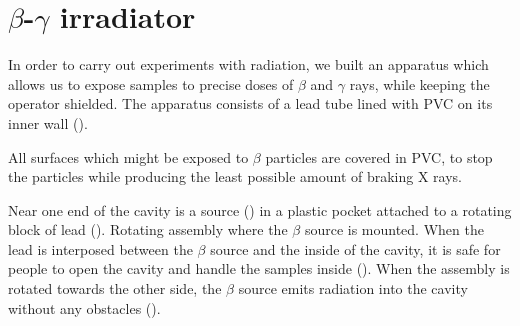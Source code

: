 \section{$\beta$-$\gamma$ irradiator}
\label{sec:irradiador}
In order to carry out experiments with radiation,
we built an apparatus which allows us to expose samples to 
precise doses of $\beta$ and $\gamma$ rays,
while keeping the operator shielded.
The apparatus consists of a lead tube lined with PVC on its inner wall
().

All surfaces which might be exposed to $\beta$ particles are covered in PVC,
to stop the particles while producing the least possible amount of braking
X rays.

Near one end of the cavity is a \Strontium source
()
in a plastic pocket attached to a rotating block of lead
().
{Rotating assembly where the $\beta$ source is mounted.}
When the lead is interposed between the $\beta$ source and the inside of the cavity,
it is safe for people to open the cavity and handle the samples inside
().
When the assembly is rotated towards the other side,
the $\beta$ source emits radiation into the cavity without any obstacles
().

